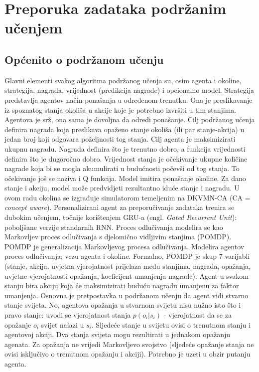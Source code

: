 \section{Preporuka zadataka podržanim učenjem}
\subsection{Općenito o podržanom učenju}
Glavni elementi svakog algoritma podržanog učenja su, osim agenta i okoline, strategija, nagrada, vrijednost (predikcija nagrade) i opcionalno model. Strategija predstavlja agentov način ponašanja u određenom trenutku. Ona je preslikavanje iz spoznatog stanja okoliša u akcije koje je potrebno izvršiti u tim stanjima. Agentova je srž, ona sama je dovoljna da odredi ponašanje. \newline
Cilj podržanog učenja definira nagrada koja preslikava opaženo stanje okoliša (ili par stanje-akcija) u jedan broj koji odgovara poželjnosti tog stanja. Cilj agenta je maksimizirati ukupnu nagradu. Nagrada definira što je trenutno dobro, a funkcija vrijednosti definira što je dugoročno dobro. Vrijednost stanja je očekivanje ukupne količine nagrade koja bi se mogla akumulirati u budućnosti počevši od tog stanja. To očekivanje još se naziva i Q funkcija.\newline
Model imitira ponašanje okoline. Za dano stanje i akciju, model može predvidjeti rezultantno iduće stanje i nagradu.\newline
\newline
U ovom radu okolina se izgrađuje simulatorom temeljenim na DKVMN-CA (CA = \textit{concept aware}). Personalizirani agent za preporučivanje zadataka trenira se dubokim učenjem, točnije korištenjem GRU-a (engl. \textit{Gated Recurrent Unit}): poboljšane verzije standarnih RNN. \newline
\newline
Proces odlučivanja modelira se kao Markovljev proces odlučivanja s djelomično vidljivim stanjima (POMDP).
POMDP je generalizacija Markovljevog procesa odlučivanja. Modelira agentov proces odlučivanja; vezu agenta i okoline.
Formalno, POMDP je skup 7 varijabli (stanje, akcija, uvjetna vjerojatnost prijelaza među stanjima, nagrada, opažanja, uvjetne vjerojatnosti opažanja, koeficijent umanjenja nagrade). Agent u svakom stanju bira akciju koja će maksimizirati buduću nagradu umanjenu za faktor umanjenja.\newline
Osnovna je pretpostavka u podržanom učenju da agent vidi stvarno stanje svijeta. No, agentova opažanja u stvarnom svijetu nisu nužno isto što i pravo stanje: uvodi se vjerojatnost stanja $p(o_i|s_i)$ - vjerojatnost da se za opažanje $o_i$ svijet nalazi u $s_i$. Sljedeće stanje u svijetu ovisi o trenutnom stanju i agentovoj akciji. Dva stanja svijeta mogu rezultirati u jednakom opažanju agenata. Za opažanja ne vrijedi Markovljevo svojstvo (sljedeće opažanje stanja ne ovisi isključivo o trenutnom opažanju i akciji). Potrebno je uzeti u obzir putanju agenta. \newline
\newline
